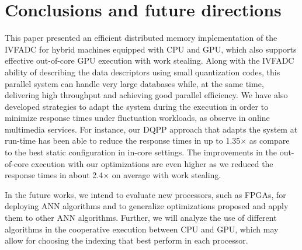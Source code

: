 \chapter{Conclusions and future directions}
\label{sec:conclusions}

This paper presented an efficient distributed memory implementation of 
the IVFADC for hybrid machines equipped with CPU and GPU, which also
supports effective out-of-core GPU execution with work stealing. Along with the
IVFADC ability of describing the data descriptors using small 
quantization codes, this parallel system can handle very large databases
while, at the same time, delivering high throughput and achieving good 
parallel efficiency. We have also developed strategies to adapt the system 
during the execution in order to minimize response times under fluctuation workloads, as observe in online multimedia services. For instance, our DQPP approach that adapts the
system at run-time has been able to reduce the response times in up to 1.35$\times$
as compare to the best static configuration in in-core settings. The improvements
in the out-of-core execution with our optimizations are even higher as we reduced 
the response times in about 2.4$\times$ on average with work stealing.


In the future works, we intend to evaluate new processors, such as FPGAs, for deploying
ANN algorithms and to generalize optimizations proposed and apply them
to other ANN algorithms. Further, we will analyze the use of different 
algorithms in the cooperative execution between CPU and GPU, which may allow
for choosing the indexing that best perform in each processor.



%
%
%
%
%
